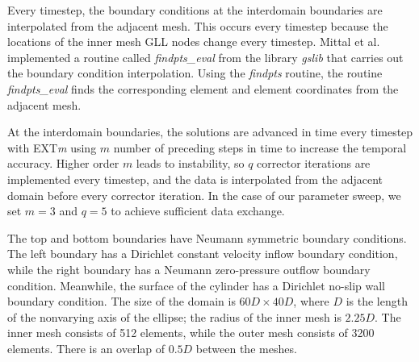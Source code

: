 Every timestep, the boundary conditions at the interdomain boundaries are interpolated from the adjacent mesh. This occurs every timestep because the locations of the inner mesh GLL nodes change every timestep. Mittal et al. \cite{mittal_nonconforming_2019} implemented a routine called \textit{findpts\_eval} from the library \textit{gslib} that carries out the boundary condition interpolation. Using the \textit{findpts} routine, the routine \textit{findpts\_eval} finds the corresponding element and element coordinates from the adjacent mesh.

At the interdomain boundaries, the solutions are advanced in time every timestep with EXT\textit{m} using $m$ number of preceding steps in time to increase the temporal accuracy. Higher order $m$ leads to instability, so $q$ corrector iterations are implemented every timestep, and the data is interpolated from the adjacent domain before every corrector iteration. In the case of our parameter sweep, we set $m=3$ and $q=5$ to achieve sufficient data exchange.
  
The top and bottom boundaries have Neumann symmetric boundary conditions. The left boundary has a Dirichlet constant velocity inflow boundary condition, while the right boundary has a Neumann zero-pressure outflow boundary condition. Meanwhile, the surface of the cylinder has a Dirichlet no-slip wall boundary condition. The size of the domain is $60D \times 40D$, where $D$ is the length of the nonvarying axis of the ellipse; the radius of the inner mesh is $2.25D$. The inner mesh consists of 512 elements, while the outer mesh consists of 3200 elements. There is an overlap of $0.5D$ between the meshes. 

